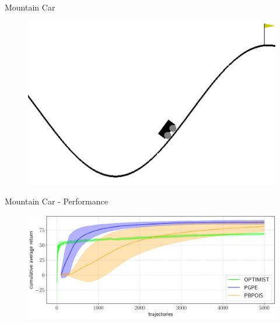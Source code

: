\begin{frame}{Mountain Car}
	\begin{figure}
		\centering
		\includegraphics[width=0.7\linewidth]{Images/MC}\\
	\end{figure}
\end{frame}


\begin{frame}{Mountain Car - Performance}
\begin{figure}
		\centering
		\includegraphics[width=1\linewidth]{Images/MC_mu}
\end{figure}
\end{frame}

